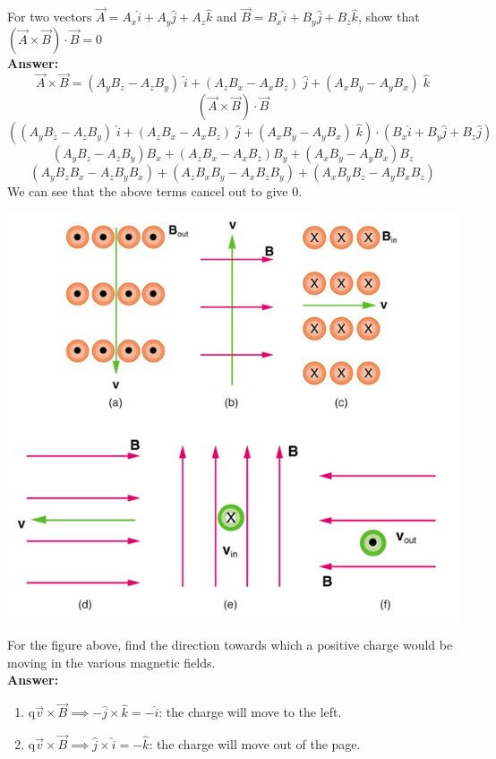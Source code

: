 \documentclass[9pt,addpoints]{exam}
\begin{document}
\begin{questions}
		\question For two vectors $\vec{A} = A_{x}\hat{i} + A_{y}\hat{j} + A_{z}\hat{k}$ and $\vec{B} = B_{x}\hat{i} + B_{y}\hat{j} + B_{z}\hat{k}$, show that $(\vec{A}\times\vec{B})\cdot\vec{B}=0$ \\ \textbf{Answer:} \\ 
		$$\vec{A} \times \vec{B} = (A_{y}B_{z} - A_{z}B_{y})\; \hat{i} + (A_{z}B_{x} - A_{x}B_{z})\; \hat{j} + (A_{x}B_{y} - A_{y}B_{x})\; \hat{k}$$
		$$(\vec{A}\times\vec{B})\cdot\vec{B}$$
		$$((A_{y}B_{z} - A_{z}B_{y})\; \hat{i} + (A_{z}B_{x} - A_{x}B_{z})\; \hat{j} + (A_{x}B_{y} - A_{y}B_{x})\; \hat{k})\cdot(B_x\hat{i}+B_y\hat{j}+B_z\hat{j})$$	
		$$(A_yB_z-A_zB_y)B_x+(A_zB_x-A_xB_z)B_y+(A_xB_y-A_yB_x)B_z$$
		$$(A_yB_zB_x-A_zB_yB_x)+(A_zB_xB_y-A_xB_zB_y)+(A_xB_yB_z-A_yB_xB_z)$$
		We can see that the above terms cancel out to give 0.
		\begin{center}
			\includegraphics[scale=0.8]{hw_fields_force.jpg}
		\end{center}
		\question For the figure above, find the direction towards which a positive charge would be moving in the various magnetic fields. \\ \textbf{Answer:} \\ 
		\begin{enumerate}[label=(\alph*)]
			\item q$\vec{v}\times\vec{B}\implies-\hat{j}\times\hat{k}=-\hat{i}$: the charge will move to the left.
			\item q$\vec{v}\times\vec{B}\implies\hat{j}\times\hat{i}=-\hat{k}$: the charge will move out of the page.

\end{enumerate}
\end{questions}
\end{document}
